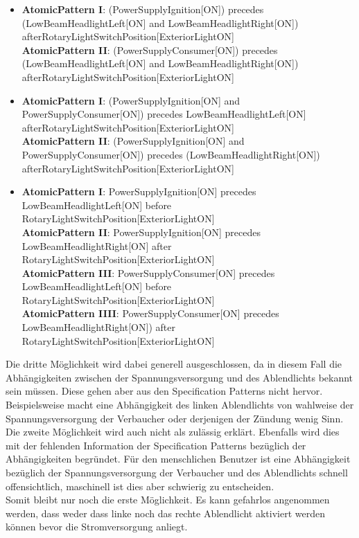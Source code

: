 \begin{itemize}
	\item \textbf{AtomicPattern I}: (PowerSupplyIgnition[ON]) precedes (LowBeamHeadlightLeft[ON] and LowBeamHeadlightRight[ON]) after\newline RotaryLightSwitchPosition[ExteriorLightON]\\ \textbf{AtomicPattern II}: (PowerSupplyConsumer[ON]) precedes (LowBeamHeadlightLeft[ON] and LowBeamHeadlightRight[ON]) after\newline RotaryLightSwitchPosition[ExteriorLightON]
	\item \textbf{AtomicPattern I}: (PowerSupplyIgnition[ON] and PowerSupplyConsumer[ON]) precedes LowBeamHeadlightLeft[ON] after\newline RotaryLightSwitchPosition[ExteriorLightON]\\ \textbf{AtomicPattern II}: (PowerSupplyIgnition[ON] and PowerSupplyConsumer[ON]) precedes (LowBeamHeadlightRight[ON]) after\newline RotaryLightSwitchPosition[ExteriorLightON]
	\item \textbf{AtomicPattern I}: PowerSupplyIgnition[ON] precedes LowBeamHeadlightLeft[ON] before RotaryLightSwitchPosition[ExteriorLightON]\\ 
	\textbf{AtomicPattern II}: PowerSupplyIgnition[ON] precedes LowBeamHeadlightRight[ON] after RotaryLightSwitchPosition[ExteriorLightON]\\
	\textbf{AtomicPattern III}: PowerSupplyConsumer[ON] precedes LowBeamHeadlightLeft[ON] before RotaryLightSwitchPosition[ExteriorLightON]\\ 
	\textbf{AtomicPattern IIII}: PowerSupplyConsumer[ON] precedes LowBeamHeadlightRight[ON]) after RotaryLightSwitchPosition[ExteriorLightON]
\end{itemize}
Die dritte Möglichkeit wird dabei generell ausgeschlossen, da in diesem Fall die Abhängigkeiten zwischen der Spannungsversorgung und des Ablendlichts bekannt sein müssen. Diese gehen aber aus den Specification Patterns nicht hervor. Beispielsweise macht eine Abhängigkeit des linken Ablendlichts von wahlweise der Spannungsversorgung der Verbaucher oder derjenigen der Zündung wenig Sinn.\\
Die zweite Möglichkeit wird auch nicht als zulässig erklärt. Ebenfalls wird dies mit der fehlenden Information der Specification Patterns bezüglich der Abhängigkeiten begründet. Für den menschlichen Benutzer ist eine Abhängigkeit bezüglich der Spannungsversorgung der Verbaucher und des Ablendlichts schnell offensichtlich, maschinell ist dies aber schwierig zu entscheiden.\\
Somit bleibt nur noch die erste Möglichkeit. Es kann gefahrlos angenommen werden, dass weder dass linke noch das rechte Ablendlicht aktiviert werden können bevor die Stromversorgung anliegt.
